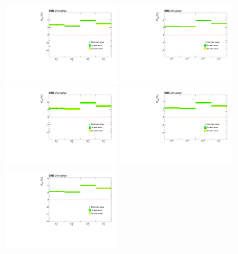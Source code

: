 \begin{figure}
    \centering
    \includegraphics[width=0.45\textwidth]{figure/SimAcp_16_el_ttbar_Acp_10.pdf}
    \includegraphics[width=0.45\textwidth]{figure/SimAcp_16_mu_ttbar_Acp_10.pdf}
    \includegraphics[width=0.45\textwidth]{figure/SimAcp_17_el_ttbar_Acp_10.pdf}
    \includegraphics[width=0.45\textwidth]{figure/SimAcp_17_mu_ttbar_Acp_10.pdf}
    \includegraphics[width=0.45\textwidth]{figure/SimAcp_18_el_ttbar_Acp_10.pdf}

\end{figure}
